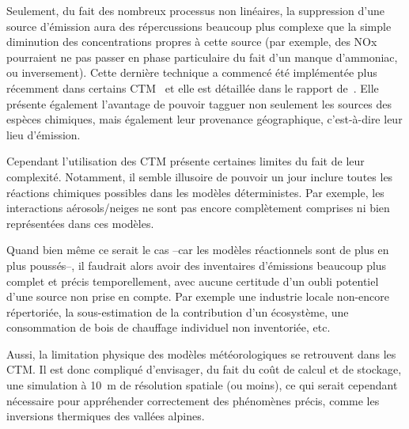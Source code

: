 Seulement, du fait des nombreux processus non linéaires, la suppression d'une source
d'émission aura des répercussions beaucoup plus complexe que la simple diminution des
concentrations propres à cette source (par exemple, des NOx pourraient ne pas passer en
phase particulaire du fait d'un manque d'ammoniac, ou inversement). 
Cette dernière technique a commencé été implémentée plus récemment dans certains
CTM~\autocite{wangDevelopment2009,wagstromDevelopment2008,kranenburgSource2013,brandtContribution2013}
et elle est détaillée dans le rapport de~\cite{mirceaEuropean2020}. Elle présente également
l'avantage de pouvoir tagguer non seulement les sources des espèces chimiques, mais
également leur provenance géographique, c'est-à-dire leur lieu d'émission.

Cependant l'utilisation des CTM présente certaines limites du fait de leur complexité.
Notamment, il semble illusoire de pouvoir un jour inclure toutes les réactions chimiques
possibles dans les modèles déterministes. Par exemple, les interactions aérosols/neiges ne
sont pas encore complètement comprises ni bien représentées dans ces modèles.

Quand bien même ce serait le cas --car les modèles réactionnels sont de plus en plus
poussés--, il faudrait alors avoir des inventaires d'émissions beaucoup plus complet et
précis temporellement, avec aucune certitude d'un oubli potentiel d'une source non prise
en compte. Par exemple une industrie locale non-encore répertoriée, la sous-estimation de
la contribution d'un écosystème, une consommation de bois de chauffage individuel non
inventoriée, etc.

Aussi, la limitation physique des modèles météorologiques se retrouvent dans les CTM. Il
est donc compliqué d'envisager, du fait du coût de calcul et de stockage, une simulation à
\SI{10}{\m} de résolution spatiale (ou moins), ce qui serait cependant nécessaire pour
appréhender correctement des phénomènes précis, comme les inversions thermiques des
vallées alpines.

